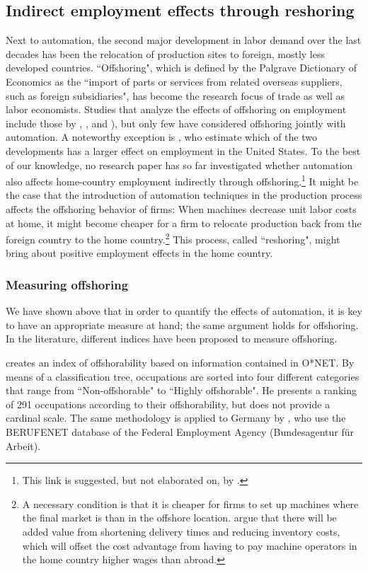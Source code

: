 \documentclass[11pt,a4paper]{article}
\begin{document}
\subsection{Indirect employment effects through reshoring}
Next to automation, the second major development in labor demand over the last decades has been the relocation of production sites to foreign, mostly less developed countries. ``Offshoring", which is defined by the Palgrave Dictionary of Economics as the ``import of parts or services from related overseas suppliers, such as foreign subsidiaries", has become the research focus of trade as well as labor economists. Studies that analyze the effects of offshoring on employment include those by \cite{FH1999}, \cite{GR2008}, \cite{EHMP2014} and \cite{HJMX2014}), but only few have considered offshoring jointly with automation. A noteworthy exception is \cite{GMS2014}, who estimate which of the two developments has a larger effect on employment in the United States. To the best of our knowledge, no research paper has so far investigated whether automation also affects home-country employment indirectly through offshoring.\footnote{This link is suggested, but not elaborated on, by \cite{BM2014}.} It might be the case that the introduction of automation techniques in the production process affects the offshoring behavior of firms: When machines decrease unit labor costs at home, it might become cheaper for a firm to relocate production back from the foreign country to the home country.\footnote{A necessary condition is that it is cheaper for firms to set up machines where the final market is than in the offshore location. \cite{BMS2014} argue that there will be added value from shortening delivery times and reducing inventory costs, which will offset the cost advantage from having to pay machine operators in the home country higher wages than abroad.}
This process, called ``reshoring", might bring about positive employment effects in the home country.

\subsubsection*{Measuring offshoring}
We have shown above that in order to quantify the effects of automation, it is key to have an appropriate measure at hand; the same argument holds for offshoring. In the literature, different indices have been proposed to measure offshoring.

\cite{B2009} creates an index of offshorability based on information contained in O*NET. By means of a classification tree, occupations are sorted into four different categories that range from ``Non-offshorable" to ``Highly offshorable". He presents a ranking of 291 occupations according to their offshorability, but does not provide a cardinal scale. The same methodology is applied to Germany by \cite{SL2009}, who use the BERUFENET database of the Federal Employment Agency (Bundesagentur für Arbeit).
\end{document}
